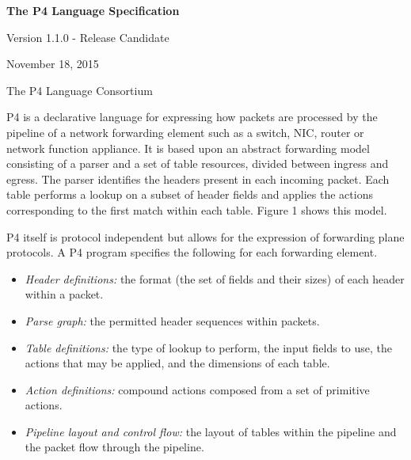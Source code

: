 \documentclass[12pt]{article}
\begin{document}
\vspace{2cm}

\centerline{\sffamily\bfseries\huge The P4 Language Specification}
\vspace{3mm}
\centerline{\sffamily\Large Version 1.1.0 - Release Candidate}
\vspace{3mm}
\centerline{\sffamily\large November 18, 2015}
\vspace{8mm}
\centerline{\sffamily\large The P4 Language Consortium}

\date{November 6, 2015}
\thispagestyle{firstpagestyle}


P4 is a declarative language for expressing how packets are processed by the 
pipeline of a network forwarding element such as a switch, NIC, router or 
network function appliance. It is based upon an abstract forwarding model 
consisting of a parser and a set of \matchaction table resources, divided 
between ingress and egress. The parser identifies the headers present in 
each incoming packet. Each \matchaction table performs a lookup on a subset 
of header fields and applies the actions corresponding to the first match 
within each table. Figure 1 shows this model.

P4 itself is protocol independent but allows for the expression of forwarding 
plane protocols. A P4 program specifies the following for each forwarding 
element.

\begin{itemize}
\item
\textit{Header definitions:} the format (the set of fields and their
sizes) of each header within a packet.
\item
\textit{Parse graph:} the permitted header sequences within packets.
\item
\textit{Table definitions:} the type of lookup to perform, the input
fields to use, the actions that may be applied, and the dimensions of
each table.
\item
\textit{Action definitions:} compound actions composed from a set of
primitive actions.
\item
\textit{Pipeline layout and control flow:} the layout of tables within
the pipeline and the packet flow through the pipeline.
\end{itemize}
\end{document}
